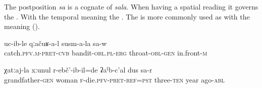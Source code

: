 The postposition \textit{sa} is a cognate of \textit{sala}. When having a spatial reading it governs the  . With the temporal meaning  the  . The   is more commonly used as  with the meaning  ().
%
\begin{exe}
	\ex
	\begin{xlist}
		\ex	\label{the bandits caught (him) at the throat}
		\gll	uc-ib-le	qːačuʁ-a-l	susm-a-la	sa-w\\
			catch.\textsc{pfv.m}-\textsc{pret}-\textsc{cvb}	bandit-\textsc{obl}.\textsc{pl}-\textsc{erg}	throat-\textsc{obl}-\textsc{gen}	in.front-\textsc{m}\\
		\glt	{}

		\ex	\label{Grandfather’s wife died 30 years ago}
		\gll	χatːaj-la	xːunul	r-ebč'-ib-il=de	ʡaˁb-c'al	dus	sa-r\\
			grandfather-\textsc{gen}	woman	\textsc{f}-die.\textsc{pfv}-\textsc{pret}-\textsc{ref}=\textsc{pst}	three-\textsc{ten}	year	ago-\textsc{abl}\\
		\glt	{}
	\end{xlist}
\end{exe}



\subsection{ }
\label{ssec:postposition hila}

